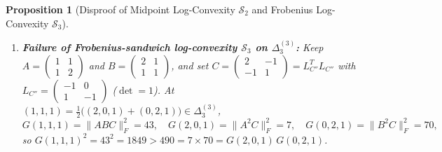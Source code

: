 \documentclass[11pt,a4paper]{article}
\newtheorem{proposition}[theorem]{Proposition}
\theoremstyle{definition}
\theoremstyle{remark}
\newcommand{\DeltaLat}{\Delta}
\begin{document}
\begin{proposition}[Disproof of Midpoint Log-Convexity $\mathcal{S}_2$ and Frobenius Log-Convexity $\mathcal{S}_3$]
\begin{enumerate}
\item \textbf{Failure of Frobenius-sandwich log-convexity $\mathcal{S}_3$ on $\DeltaLat_3^{(3)}$:} Keep $A = \begin{pmatrix} 1 & 1 \\ 1 & 2 \end{pmatrix}$ and $B = \begin{pmatrix} 2 & 1 \\ 1 & 1 \end{pmatrix}$, and set $C = \begin{pmatrix} 2 & -1 \\ -1 & 1 \end{pmatrix} = L_{C''}^T L_{C''}$ with $L_{C''} = \begin{pmatrix} -1 & 0 \\ 1 & -1 \end{pmatrix}$ ($\det = 1$). At $(1, 1, 1) = \frac{1}{2}\bigl((2, 0, 1) + (0, 2, 1)\bigr) \in \DeltaLat_3^{(3)}$,
\[
G(1, 1, 1) = \|ABC\|_F^2 = 43, \quad
G(2, 0, 1) = \|A^2 C\|_F^2 = 7, \quad
G(0, 2, 1) = \|B^2 C\|_F^2 = 70,
\]
so $G(1, 1, 1)^2 = 43^2 = 1849 > 490 = 7 \times 70 = G(2, 0, 1)\,G(0, 2, 1)$.
\end{enumerate}
\end{proposition}
\end{document}
